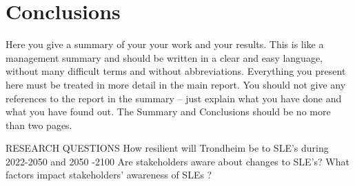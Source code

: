 \section{Conclusions}
Here you give a summary of your your work and your results. This is like a management summary and should be written in a clear and easy language, without many difficult terms and without abbreviations. Everything you present here must be treated in more detail in the main report. You should not give any references to the report in the summary -- just explain what you have done and what you have found out. The Summary and Conclusions should be no more than two pages.

RESEARCH QUESTIONS
How resilient will Trondheim be to SLE’s during 2022-2050 and 2050 -2100
Are stakeholders aware about changes to SLE’s?
What factors impact stakeholders’ awareness of SLEs ?
